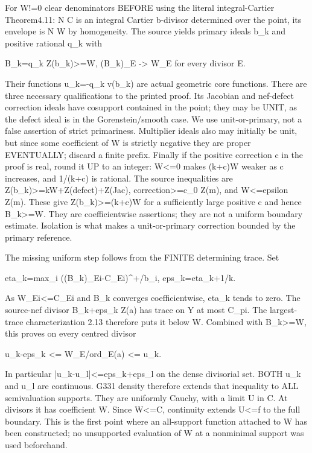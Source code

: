 \documentclass[11pt]{article}
\begin{document}
For W!=0 clear denominators BEFORE using the literal integral-Cartier Theorem4.11: N C is an integral Cartier b-divisor determined over the point, its envelope is N W by homogeneity. The source yields primary ideals b\_k and positive rational q\_k with

    B\_k=q\_k Z(b\_k)>=W,    (B\_k)\_E -> W\_E for every divisor E.

Their functions u\_k=-q\_k v(b\_k) are actual geometric core functions. There are three necessary qualifications to the printed proof. Its Jacobian and nef-defect correction ideals have cosupport contained in the point; they may be UNIT, as the defect ideal is in the Gorenstein/smooth case. We use unit-or-primary, not a false assertion of strict primariness. Multiplier ideals also may initially be unit, but since some coefficient of W is strictly negative they are proper EVENTUALLY; discard a finite prefix. Finally if the positive correction c in the proof is real, round it UP to an integer: W<=0 makes (k+c)W weaker as c increases, and 1/(k+c) is rational. The source inequalities are Z(b\_k)>=kW+Z(defect)+Z(Jac), correction>=c\_0 Z(m), and W<=epsilon Z(m). These give Z(b\_k)>=(k+c)W for a sufficiently large positive c and hence B\_k>=W. They are coefficientwise assertions; they are not a uniform boundary estimate. Isolation is what makes a unit-or-primary correction bounded by the primary reference.

The missing uniform step follows from the FINITE determining trace. Set

    eta\_k=max\_i ((B\_k)\_Ei-C\_Ei)\textasciicircum{}+/b\_i,   eps\_k=eta\_k+1/k.

As W\_Ei<=C\_Ei and B\_k converges coefficientwise, eta\_k tends to zero. The source-nef divisor B\_k+eps\_k Z(a) has trace on Y at most C\_pi. The largest-trace characterization 2.13 therefore puts it below W. Combined with B\_k>=W, this proves on every centred divisor

    u\_k-eps\_k <= W\_E/ord\_E(a) <= u\_k.

In particular |u\_k-u\_l|<=eps\_k+eps\_l on the dense divisorial set. BOTH u\_k and u\_l are continuous. G331 density therefore extends that inequality to ALL semivaluation supports. They are uniformly Cauchy, with a limit U in C. At divisors it has coefficient W. Since W<=C, continuity extends U<=f to the full boundary. This is the first point where an all-support function attached to W has been constructed; no unsupported evaluation of W at a nonminimal support was used beforehand.
\end{document}

